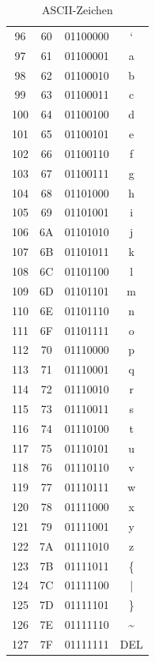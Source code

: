 \begin{table}[H]
\begin{tabular}{cccc}
            \midrule
        96 & 60 & 01100000 & ` \\
        97 & 61 & 01100001 & a \\
        98 & 62 & 01100010 & b \\
        99 & 63 & 01100011 & c \\
        100 & 64 & 01100100 & d \\
        101 & 65 & 01100101 & e \\
        102 & 66 & 01100110 & f \\
        103 & 67 & 01100111 & g \\
        104 & 68 & 01101000 & h \\
        105 & 69 & 01101001 & i \\
        106 & 6A & 01101010 & j \\
        107 & 6B & 01101011 & k \\
        108 & 6C & 01101100 & l \\
        109 & 6D & 01101101 & m \\
        110 & 6E & 01101110 & n \\
        111 & 6F & 01101111 & o \\
        112 & 70 & 01110000 & p \\
        113 & 71 & 01110001 & q \\
        114 & 72 & 01110010 & r \\
        115 & 73 & 01110011 & s \\
        116 & 74 & 01110100 & t \\
        117 & 75 & 01110101 & u \\
        118 & 76 & 01110110 & v \\
        119 & 77 & 01110111 & w \\
        120 & 78 & 01111000 & x \\
        121 & 79 & 01111001 & y \\
        122 & 7A & 01111010 & z \\
        123 & 7B & 01111011 & \{ \\
        124 & 7C & 01111100 & | \\
        125 & 7D & 01111101 & \} \\
        126 & 7E & 01111110 & \textasciitilde \\
        127 & 7F & 01111111 & DEL \\
        \bottomrule
    \end{tabular}
    \caption{ASCII-Zeichen}
    \label{table:ascii}
\end{table}

